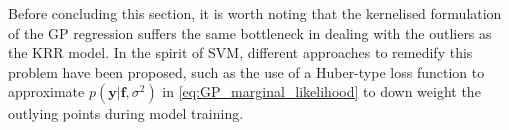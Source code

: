 Before concluding this section, it is worth noting that the kernelised formulation of the GP regression suffers the same bottleneck in dealing with the outliers as the KRR model. In the spirit of SVM, different approaches to remedify this problem have been proposed, such as the use of a Huber-type loss function\cite{huber1992robust} to approximate $p(\bm{y}|\bm{f},\sigma^2)$ in \cref{eq:GP_marginal_likelihood} to down weight the outlying points during model training.\cite{algikar2023robust}